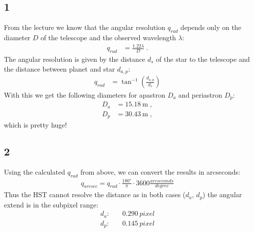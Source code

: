 \documentclass[11pt,a4paper,twoside]{article}
\begin{document}
\subsection*{1}
From the lecture we know that the angular resolution $q_{rad}$ depends only on the
diameter $D$ of the telescope and the observed wavelength $\lambda$:
\begin{align}
    q_{rad} &= \frac{1.22 \lambda}{D} \;.
\end{align}
The angular resolution is given by the distance $d_s$ of the star to the 
telescope and the distance between planet and star $d_{a,p}$:
\begin{align}
    q_{rad} &= \tan^{-1}\left( \frac{d_{a,p}}{d_s} \right)
\end{align}
With this we get the following diameters for apastron $D_a$ and periastron 
$D_p$:
\begin{align}
    D_a &= \SI{15.18}{\meter}  \;, \\
    D_p &= \SI{30.43}{\meter}  \;,
\end{align}
which is pretty huge!

\subsection*{2}
Using the calculated $q_{rad}$ from above, we can convert the results in 
arcseconds:
\begin{align}
    q_{arcsec} = q_{rad} \cdot \frac{\ang{180}}{\pi} \cdot 3600 
                 \frac{\si{arcseconds}}{\si{degree}}
\end{align}
Thus the HST cannot resolve the distance as in both cases ($d_a$, $d_p$) the
angular extend is in the subpixel range:
\begin{align}
    d_a: &\quad \SI{0.290}{pixel} \\
    d_p: &\quad \SI{0.145}{pixel}
\end{align}
\end{document}
